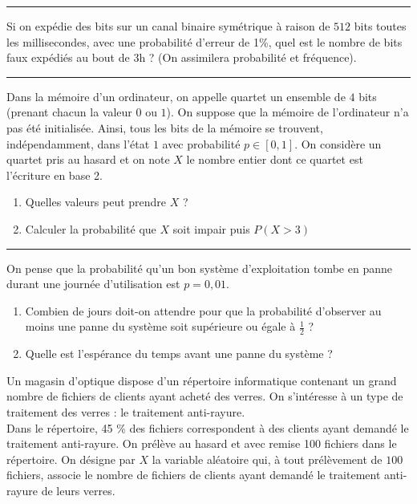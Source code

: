 \documentclass[../PolyS4.tex]{subfiles}
\begin{document}
\hfill\break
\hrule
\hfill\break


Si on expédie des bits sur un canal binaire symétrique à raison de $512$ bits toutes les millisecondes, avec une probabilité d'erreur de 1\%, quel est le nombre de bits faux expédiés au bout de $3$h ? (On assimilera probabilité et fréquence).\\

\hfill\break
\hrule
\hfill\break




Dans la mémoire d'un ordinateur, on appelle quartet un ensemble de $4$ bits (prenant chacun
la valeur $0$ ou $1$). On suppose que la mémoire de l'ordinateur n'a pas été initialisée. Ainsi, tous les bits de la mémoire se trouvent, indépendamment, dans l'état $1$ avec probabilité $p \in [0, 1]$. On considère un quartet pris au hasard et on note $X$ le nombre entier dont ce quartet est l'écriture en base 2.
\begin{enumerate}
\item Quelles valeurs peut prendre $X$ ?
\item Calculer la probabilité que $X $ soit impair puis $P(X > 3)$\\

\end{enumerate}

\hfill\break
\hrule
\hfill\break


On pense que la probabilité qu'un bon système d'exploitation tombe en panne durant une
journée d'utilisation est $p = 0, 01$.
\begin{enumerate}
\item Combien de jours doit-on attendre pour que la probabilité d'observer au moins une panne du système soit supérieure ou égale à $\frac{1}{2}$ ?
\item Quelle est l'espérance du temps avant une panne du système ?\\
\end{enumerate}

\newpage
{}

Un magasin d'optique dispose d'un répertoire informatique contenant un grand nombre de fichiers de clients ayant acheté des verres. On s'intéresse à un type de traitement des verres : le traitement anti-rayure.\\
 Dans le répertoire, 45 \% des fichiers correspondent à des clients ayant demandé le traitement anti-rayure. On prélève au hasard et avec remise 100 fichiers dans le répertoire. On désigne par $X$ la variable aléatoire qui, à tout
prélèvement de $100$ fichiers, associe le nombre de fichiers de clients ayant demandé le traitement anti-rayure
de leurs verres.\\
\end{document}
